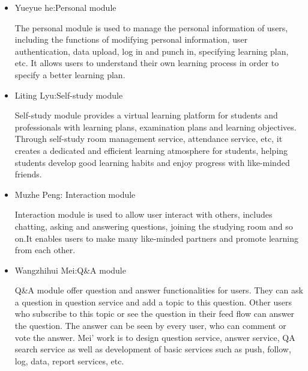 \documentclass[runningheads]{llncs}
\begin{document}
   \begin{itemize}

   \item Yueyue he:Personal module
\par The personal module is used to manage the personal information of users, including the functions of modifying personal information, user authentication, data upload, log in and punch in, specifying learning plan, etc. It allows users to understand their own learning process in order to specify a better learning plan.
 \item Liting Lyu:Self-study module
\par Self-study module provides a virtual learning platform for students and professionals with learning plans, examination plans and learning objectives. Through self-study room management service, attendance service, etc, it creates a dedicated and efficient learning atmosphere for students, helping students develop good learning habits and enjoy progress with like-minded friends.
 \item Muzhe Peng: Interaction module
\par Interaction module is used to allow user interact with others, includes chatting, asking and answering questions, joining the studying room and so on.It enables users to make many like-minded partners and promote learning from each other.
\item Wangzhihui Mei:Q\&A module
\par Q\&A module offer question and answer functionalities for users. They can ask a question in question service and add a topic to this question. Other users who subscribe to this topic or see the question in their feed flow can answer the question. The answer can be seen by every user, who can comment or vote the answer. Mei' work is to design question service, answer service, QA search service as well as development of basic services such as push, follow, log, data, report services, etc.
\end{itemize}
    
    \noindent 
\end{document}
